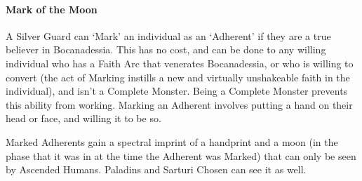 \documentclass[oneside,11pt,english]{book}
\begin{document}
\paragraph{Mark of the Moon}
A Silver Guard can ‘Mark’ an individual as an ‘Adherent’ if they are a true believer in 
Bocanadessia. This has no cost, and can be done to any willing individual who has a Faith Arc 
that venerates Bocanadessia, or who is willing to convert (the act of Marking instills a new and 
virtually unshakeable faith in the individual), and isn't a Complete Monster. Being a Complete 
Monster prevents this ability from working. Marking an Adherent involves putting a hand on 
their head or face, and willing it to be so. 

Marked Adherents gain a spectral imprint of a handprint and a moon (in the phase that it was in at the time the Adherent was Marked) that can only be seen by Ascended Humans. Paladins and 
Sarturi Chosen can see it as well. 
\end{document}
